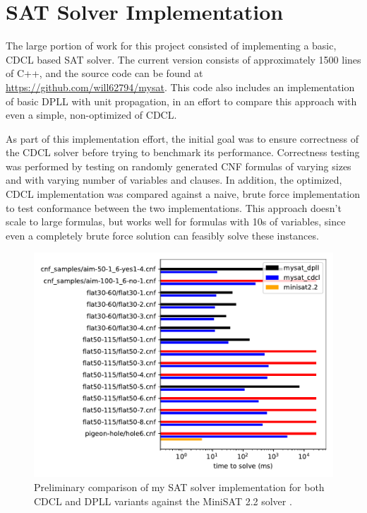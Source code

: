 \documentclass[12pt]{article}
\begin{document}
\section{SAT Solver Implementation}

The large portion of work for this project consisted of implementing a basic, CDCL based SAT solver. The current version consists of approximately 1500 lines of C++, and the source code can be found at \url{https://github.com/will62794/mysat}. This code also includes an implementation of basic DPLL with unit propagation, in an effort to compare this approach with even a simple, non-optimized of CDCL.

As part of this implementation effort, the initial goal was to ensure correctness of the CDCL solver before trying to benchmark its performance. Correctness testing was performed by testing on randomly generated CNF formulas of varying sizes and with varying number of variables and clauses. In addition, the optimized, CDCL implementation was compared against a naive, brute force implementation to test conformance between the two implementations. This approach doesn't scale to large formulas, but works well for formulas with 10s of variables, since even a completely brute force solution can feasibly solve these instances.

\begin{figure}
    \begin{center}
        \includegraphics[scale=0.6]{../results/compare.pdf}
    \end{center}
    \label{fig:benchmarks}
    \caption{Preliminary comparison of my SAT solver implementation for both CDCL and DPLL variants against the MiniSAT 2.2 solver \cite{minisat}. }
\end{figure}
\end{document}
